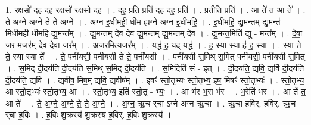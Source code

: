 \documentclass[17pt]{extarticle}
\begin{document}
1. र॒क्षसो॑ दह दह र॒क्षसो॑ र॒क्षसो॑ दह । . द॒ह॒ प्रति॒ प्रति॑ दह दह॒ प्रति॑ । . प्रतीति॒ प्रति॑ । . आ ते॑ त॒ आ ते᳚ । . ते॒ अ॒ग्ने॒ अ॒ग्ने॒ ते॒ ते॒ अ॒ग्ने॒ । . अ॒ग्न॒ इ॒धी॒म॒ही॒ धी॒म॒ ह्य॒ग्ने॒ अ॒ग्न॒ इ॒धी॒म॒हि॒ । . इ॒धी॒म॒हि॒ द्यु॒मन्त॑म् द्यु॒मन्त॑ मिधीमही धीमहि द्यु॒मन्त᳚म् । . द्यु॒मन्त॑म् देव देव द्यु॒मन्त॑म् द्यु॒मन्त॑म् देव । . द्यु॒मन्त॒मिति॑ द्यु - मन्त᳚म् । . दे॒वा॒ जर॑ म॒जर॑म् देव देवा॒ जर᳚म् । . अ॒जर॒मित्य॒जर᳚म् । . यद्ध॑ ह॒ यद् यद्ध॑ । . ह॒ स्या स्या ह॑ ह॒ स्या । . स्या ते॑ ते॒ स्या स्या ते᳚ । . ते॒ पनी॑यसी॒ पनी॑यसी ते ते॒ पनी॑यसी । . पनी॑यसी स॒मिथ् स॒मित् पनी॑यसी॒ पनी॑यसी स॒मित् । . स॒मिद् दी॒दय॑ति दी॒दय॑ति स॒मिथ् स॒मिद् दी॒दय॑ति । . स॒मिदिति॑ सं - इत् । . दी॒दय॑ति॒ द्यवि॒ द्यवि॑ दी॒दय॑ति दी॒दय॑ति॒ द्यवि॑ । . द्यवीष॒ मिष॒म् द्यवि॒ द्यवीष᳚म् । . इषꣳ॑ स्तो॒तृभ्यः॑ स्तो॒तृभ्य॒ इष॒ मिषꣳ॑ स्तो॒तृभ्यः॑ । . स्तो॒तृभ्य॒ आ स्तो॒तृभ्यः॑ स्तो॒तृभ्य॒ आ । . स्तो॒तृभ्य॒ इति॑ स्तो॒तृ - भ्यः॒ । . आ भ॑र भ॒रा भ॑र । . भ॒रेति॑ भर । . आ ते॑ त॒ आ ते᳚ । . ते॒ अ॒ग्ने॒ अ॒ग्ने॒ ते॒ ते॒ अ॒ग्ने॒ । . अ॒ग्न॒ ऋ॒च र्‌चा ऽग्ने॑ अग्न ऋ॒चा । . ऋ॒चा ह॒विर्. ह॒विर्. ऋ॒च र्‌चा ह॒विः । . ह॒विः शु॒क्रस्य॑ शु॒क्रस्य॑ ह॒विर्. ह॒विः शु॒क्रस्य॑ । \newline
\end{document}
